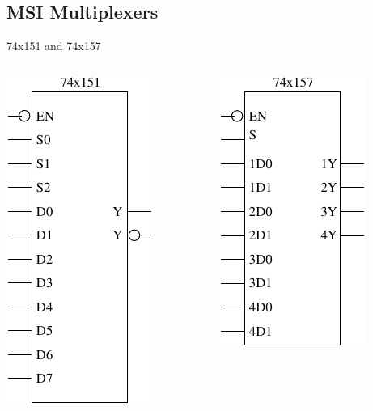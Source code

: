 \subsection{MSI Multiplexers}

\begin{frame}{74x151 and 74x157}
  \begin{columns}
    \begin{column}{5cm}
      \begin{center}
        \includegraphics{74x151Schematic}
      \end{center}
    \end{column}
    \begin{column}{5cm}
      \begin{center}
        \includegraphics{74x157Schematic}
      \end{center}
    \end{column}
  \end{columns}
\end{frame}

